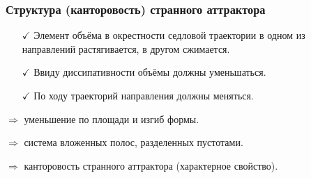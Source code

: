 \begin{frame}
\frametitle{Структура (канторовость) странного аттрактора}
    
\begin{itemize}
    \item[$\checkmark$] Элемент объёма в окрестности седловой траектории в одном из направлений растягивается, в другом сжимается. 
    \item[$\checkmark$] Ввиду диссипативности объёмы должны уменьшаться. 
    \item[$\checkmark$] По ходу траекторий направления должны меняться.
\end{itemize}

$\Rightarrow$ уменьшение по площади и изгиб формы.

$\Rightarrow$ система вложенных полос, разделенных пустотами.

$\Rightarrow$ канторовость странного аттрактора (характерное свойство).

\end{frame}